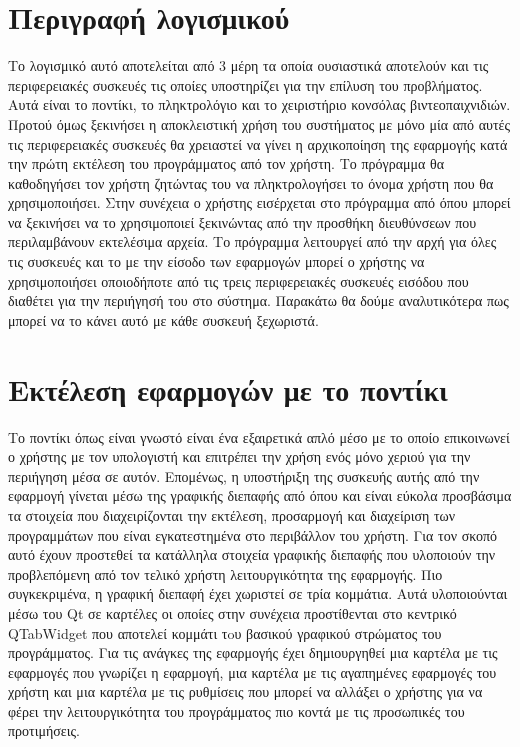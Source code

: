 








\section{Περιγραφή λογισμικού}


Το λογισμικό αυτό αποτελείται από 3 μέρη τα οποία ουσιαστικά αποτελούν και
τις περιφερειακές συσκευές τις οποίες υποστηρίζει για την επίλυση του προβλήματος.
Αυτά είναι το ποντίκι, το πληκτρολόγιο και το χειριστήριο κονσόλας βιντεοπαιχνιδιών.
Προτού όμως ξεκινήσει η αποκλειστική χρήση του συστήματος με μόνο μία από αυτές
τις περιφερειακές συσκευές θα χρειαστεί να γίνει η αρχικοποίηση της εφαρμογής κατά
την πρώτη εκτέλεση του προγράμματος από τον χρήστη. Το πρόγραμμα θα καθοδηγήσει τον
χρήστη ζητώντας του να πληκτρολογήσει το όνομα χρήστη που θα χρησιμοποιήσει. Στην συνέχεια
ο χρήστης εισέρχεται στο πρόγραμμα από όπου μπορεί να ξεκινήσει να το χρησιμοποιεί ξεκινώντας
από την προσθήκη διευθύνσεων που περιλαμβάνουν εκτελέσιμα αρχεία. Το πρόγραμμα λειτουργεί
από την αρχή για όλες τις συσκευές και το με την είσοδο των εφαρμογών μπορεί ο χρήστης
να χρησιμοποιήσει οποιοδήποτε από τις τρεις περιφερειακές συσκευές εισόδου που διαθέτει
για την περιήγησή του στο σύστημα. Παρακάτω θα δούμε αναλυτικότερα πως μπορεί να το κάνει
αυτό με κάθε συσκευή ξεχωριστά.

\section{Εκτέλεση εφαρμογών με το ποντίκι}


Το ποντίκι όπως είναι γνωστό είναι ένα εξαιρετικά απλό μέσο με το οποίο επικοινωνεί
ο χρήστης με τον υπολογιστή και επιτρέπει την χρήση ενός μόνο χεριού για την περιήγηση
μέσα σε αυτόν. Επομένως, η υποστήριξη της συσκευής αυτής από την εφαρμογή γίνεται
μέσω της γραφικής διεπαφής από όπου και είναι εύκολα προσβάσιμα τα στοιχεία που
διαχειρίζονται την εκτέλεση, προσαρμογή και διαχείριση των προγραμμάτων που είναι
εγκατεστημένα στο περιβάλλον του χρήστη. Για τον σκοπό αυτό έχουν προστεθεί τα κατάλληλα
στοιχεία γραφικής διεπαφής που υλοποιούν την προβλεπόμενη από τον τελικό χρήστη 
λειτουργικότητα της εφαρμογής. Πιο συγκεκριμένα, η γραφική διεπαφή έχει χωριστεί σε τρία κομμάτια.
Αυτά υλοποιούνται μέσω του Qt σε καρτέλες οι οποίες στην συνέχεια προστίθενται στο
κεντρικό QTabWidget που αποτελεί κομμάτι τoυ βασικού γραφικού στρώματος του προγράμματος.
Για τις ανάγκες της εφαρμογής έχει δημιουργηθεί μια καρτέλα με τις εφαρμογές που γνωρίζει
η εφαρμογή, μια καρτέλα με τις αγαπημένες εφαρμογές του χρήστη και μια καρτέλα με τις
ρυθμίσεις που μπορεί να αλλάξει ο χρήστης για να φέρει την λειτουργικότητα του προγράμματος
πιο κοντά με τις προσωπικές του προτιμήσεις.

